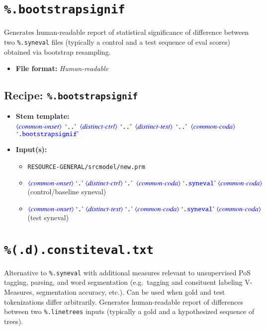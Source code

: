 \documentclass[12pt]{report}
\def\blue{\color{blue}}
\begin{document}
\section{\blue\tt \%.bootstrapsignif}

Generates human-readable report of statistical significance of difference between two {\blue\tt \%.syneval} files (typically a control and a test sequence of eval scores) obtained via bootstrap resampling.

\begin{itemize}
\item\textbf{File format:} \textit{Human-readable}
\end{itemize}

\subsection{Recipe: {\blue\tt \%.bootstrapsignif}}

\begin{itemize}
      \item \textbf{Stem template:}\\
      $\dtype{common-onset}$ $\dcode{..}$ $\dtype{distinct-ctrl}$ $\dcode{..}$ $\dtype{distinct-test}$ $\dcode{..}$ $\dtype{common-coda}$ $\dcode{.bootstrapsignif}$
      \item \textbf{Input(s):}
      \begin{itemize}
            \item {\tt RESOURCE-GENERAL/srcmodel/new.prm}
            \item  $\dtype{common-onset} \ \dcode{.} \ \dtype{distinct-ctrl} \ \dcode{.} \ \ \dtype{common-coda} \ \dcode{.syneval} \ \dtype{common-coda}$ (control/baseline syneval)
            \item  $\dtype{common-onset} \ \dcode{.} \ \dtype{distinct-test} \ \dcode{.} \ \dtype{common-coda} \ \dcode{.syneval} \ \dtype{common-coda}$ (test syneval)
      \end{itemize}
\end{itemize}


\section{\blue\tt \%(.d).constiteval.txt}

Alternative to {\blue\tt \%.syneval} with additional measures relevant to unsupervised PoS tagging, parsing, and word segmentation (e.g.\ tagging and consituent labeling V-Measures, segmentation accuracy, etc.). Can be used when gold and test tokenizations differ arbitrarily. Generates human-readable report of differences between two {\blue\tt \%.linetrees} inputs (typically a gold and a hypothesized sequence of trees).
\end{document}
